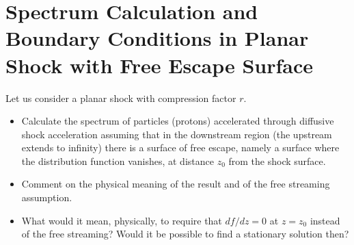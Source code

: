 \section{Spectrum Calculation and Boundary Conditions in Planar Shock with Free Escape Surface}

Let us consider a planar shock with compression factor $r$. 

\begin{itemize}
\item Calculate the spectrum of particles (protons) accelerated through diffusive shock acceleration assuming that in the downstream region (the upstream extends to infinity) there is a surface of free escape, namely a surface where the distribution function vanishes, at distance $z_0$ from the shock surface. 

\item Comment on the physical meaning of the result and of the free streaming assumption. 

\item What would it mean,
physically, to require that $df/dz=0$ at $z=z_0$ instead of the free streaming? Would it be possible to
find a stationary solution then?
\end{itemize}